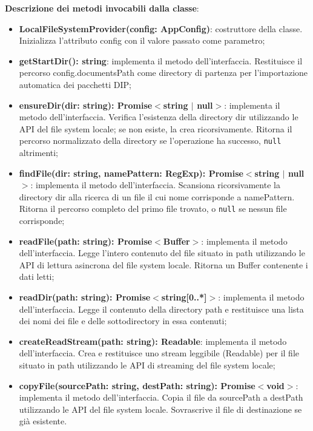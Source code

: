 \documentclass[a4paper,12pt]{article}
\begin{document}
{{{                \noindent \textbf{Descrizione dei metodi invocabili dalla classe}:
                \begin{itemize}
                    \item \textbf{LocalFileSystemProvider(config: AppConfig)}: costruttore della classe. Inizializza l'attributo config con il valore passato come parametro;
                    \item \textbf{getStartDir(): string}: implementa il metodo dell'interfaccia. Restituisce il percorso config.documentsPath come directory di partenza per l'importazione automatica dei pacchetti DIP;
                    \item \textbf{ensureDir(dir: string): Promise$<$string $|$ null$>$}: implementa il metodo dell'interfaccia. Verifica l'esistenza della directory dir utilizzando le API del file system locale; se non esiste, la crea ricorsivamente. Ritorna il percorso normalizzato della directory se l'operazione ha successo, \texttt{null} altrimenti;
                    \item \textbf{findFile(dir: string, namePattern: RegExp): Promise$<$string $|$ null$>$}: implementa il metodo dell'interfaccia. Scansiona ricorsivamente la directory dir alla ricerca di un file il cui nome corrisponde a namePattern. Ritorna il percorso completo del primo file trovato, o \texttt{null} se nessun file corrisponde;
                    \item \textbf{readFile(path: string): Promise$<$Buffer$>$}: implementa il metodo dell'interfaccia. Legge l'intero contenuto del file situato in path utilizzando le API di lettura asincrona del file system locale. Ritorna un Buffer contenente i dati letti;
                    \item \textbf{readDir(path: string): Promise$<$string[0..*]$>$}: implementa il metodo dell'interfaccia. Legge il contenuto della directory path e restituisce una lista dei nomi dei file e delle sottodirectory in essa contenuti;
                    \item \textbf{createReadStream(path: string): Readable}: implementa il metodo dell'interfaccia. Crea e restituisce uno stream leggibile (Readable) per il file situato in path utilizzando le API di streaming del file system locale;
                    \item \textbf{copyFile(sourcePath: string, destPath: string): Promise$<$void$>$}: implementa il metodo dell'interfaccia. Copia il file da sourcePath a destPath utilizzando le API del file system locale. Sovrascrive il file di destinazione se già esistente.
                \end{itemize}
}}}
\end{document}
